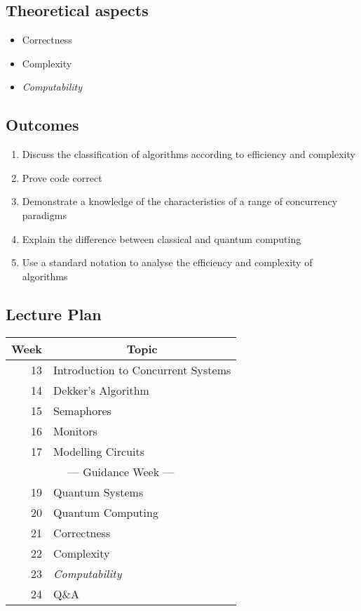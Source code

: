 \documentclass{article}
\begin{document}
\subsection{Theoretical aspects}
\begin{itemize}
\item Correctness
\item Complexity
\item {\em Computability}
\end{itemize}


\subsection{Outcomes}

\begin{enumerate}
\item Discuss the classification of algorithms according to
efficiency and complexity
\item Prove code correct
\item Demonstrate a knowledge of the characteristics of a range
of concurrency paradigms
\item Explain the difference between classical and quantum computing
\item Use a standard notation to analyse the efficiency and
complexity of algorithms
\end{enumerate}

\subsection{Lecture Plan}
\begin{center}
\begin{tabular}{|r|l|}
\hline
Week & \multicolumn{1}{c|}{Topic}\\
\hline\hline
13 & Introduction to Concurrent Systems \\
\hline
14 & Dekker's Algorithm \\
\hline
15 & Semaphores \\
\hline
16 & Monitors \\
\hline
17 & Modelling Circuits \\
\hline
\multicolumn{2}{|c|}{--- Guidance Week ---}\\
\hline
19 & Quantum Systems \\
\hline
20 & Quantum Computing \\
\hline
21 & Correctness \\
\hline
22 & Complexity \\
\hline
23 & {\em Computability} \\
\hline
24 & Q\&{}A\\
\hline
\end{tabular}
\end{center}
\end{document}
